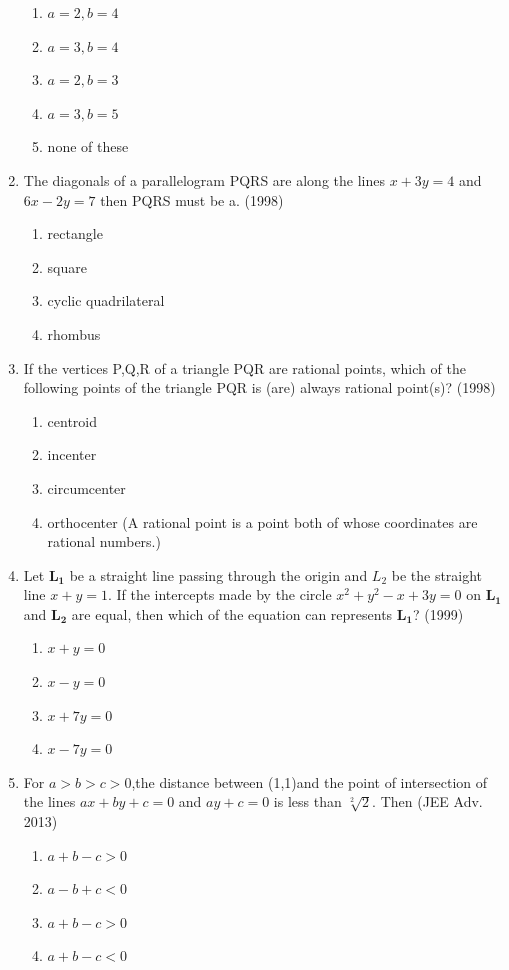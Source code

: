 \documentclass[12pt]{article}
\let\vec\mathbf
\begin{document}
\begin{enumerate}
\begin{enumerate}
\item $a=2,b=4$
\item $a=3,b=4$ 
\item $a=2,b=3$
\item $a=3,b=5$
\item none of these
\end{enumerate}
\item The diagonals of a parallelogram PQRS are along the lines $x+3y=4$ and $6x-2y=7$ then PQRS must be a. (1998)\\
\begin{enumerate}
\item rectangle
\item square
\item cyclic quadrilateral
\item rhombus
\end{enumerate}
\item If the vertices P,Q,R of a triangle PQR are rational points, which of the following points of the triangle PQR is (are) always rational point(s)? (1998)\\
\begin{enumerate}
\item centroid 
\item incenter
\item circumcenter 
\item orthocenter
(A rational point is a point both of whose coordinates are rational numbers.)
\end{enumerate}
\item  Let $\vec{L_1}$ be a straight line passing through the origin and $L_2$ be the straight line $x+y=1$. If the intercepts made by the circle $x^2+y^2-x+3y=0$ on $\vec{L_1}$ and $\vec{L_2}$ are equal, then which of the equation can represents $\vec{L_1}$? (1999)\\
\begin{enumerate}
\item $x+y=0$   
\item $x-y=0$ 
\item $x+7y=0$  
\item $x-7y=0$
\end{enumerate}
\item For $a>b>c>0$,the distance between (1,1)and the point of intersection of the lines $ax+by+c=0$ and $ay+c=0$ is less than $\sqrt[2]{2}$. Then (JEE Adv. 2013)\\
\begin{enumerate}
\item $a+b-c>0$ 
\item $a-b+c<0$
\item $a+b-c>0$
\item $a+b-c<0$
\end{enumerate}

\end{enumerate}
\end{document}
